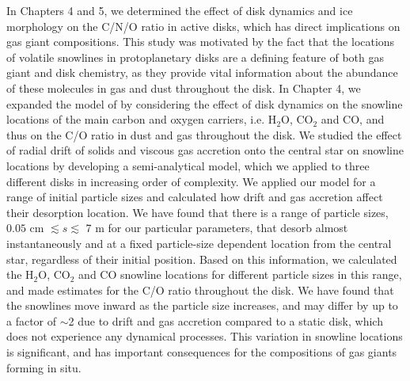 In Chapters 4 and 5, we determined the effect of disk dynamics and ice morphology on the C/N/O ratio in active disks, which has direct implications on gas giant compositions. This study was motivated by the fact that the locations of volatile snowlines in protoplanetary disks are a defining feature of both gas giant and disk chemistry, as they provide vital information about the abundance of these molecules in gas and dust throughout the disk. In Chapter 4, we expanded the model of \citet{oberg11} by considering the effect of disk dynamics on the snowline locations of the main carbon and oxygen carriers, i.e. H$_2$O, CO$_2$ and CO, and thus on the C/O ratio in dust and gas throughout the disk. We studied the effect of radial drift of solids and viscous gas accretion onto the central star on snowline locations by developing a semi-analytical model, which we applied to three different disks in increasing order of complexity. We applied our model for a range of initial particle sizes and calculated how drift and gas accretion affect their desorption location. We have found that there is a range of particle sizes, $0.05$ cm $\lesssim s \lesssim$ 7 m for our particular parameters, that desorb almost instantaneously and at a fixed particle-size dependent location from the central star, regardless of their initial position. Based on this information, we calculated the H$_2$O, CO$_2$ and CO snowline locations for different particle sizes in this range, and made estimates for the C/O ratio throughout the disk. We have found that the snowlines move inward as the particle size increases, and may differ by up to a factor of $\sim$2 due to drift and gas accretion compared to a static disk, which does not experience any dynamical processes. This variation in snowline locations is significant, and has important consequences for the compositions of gas giants forming in situ. 

